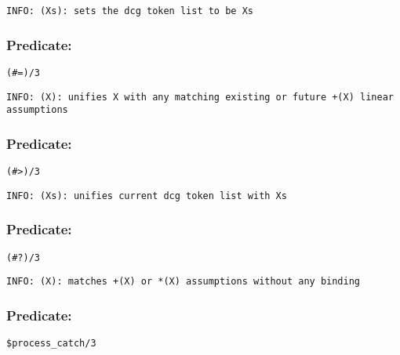 {\small \begin{verbatim}
INFO: (Xs): sets the dcg token list to be Xs

\end{verbatim}}

\subsubsection{Predicate:} \label{V35WV61WV95W3}

\begin{verbatim}
(#=)/3
\end{verbatim}

{\small \begin{verbatim}
INFO: (X): unifies X with any matching existing or future +(X) linear assumptions

\end{verbatim}}

\subsubsection{Predicate:} \label{V35WV62WV95W3}

\begin{verbatim}
(#>)/3
\end{verbatim}

{\small \begin{verbatim}
INFO: (Xs): unifies current dcg token list with Xs

\end{verbatim}}

\subsubsection{Predicate:} \label{V35WV63WV95W3}

\begin{verbatim}
(#?)/3
\end{verbatim}

{\small \begin{verbatim}
INFO: (X): matches +(X) or *(X) assumptions without any binding

\end{verbatim}}

\subsubsection{Predicate:} \label{V36WprocessV95WcatchV95W3}

\begin{verbatim}
$process_catch/3
\end{verbatim}

